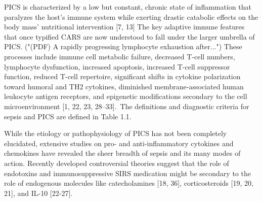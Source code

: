 PICS is characterized by a low but constant, chronic state of
inflammation that paralyzes the host's immune system while exerting
drastic catabolic effects on the body mass' nutritional intervention {[}7, 13{]}
The key adaptive immune features that once typified CARS are now
understood to fall under the larger umbrella of PICS. ("(PDF) A rapidly
progressing lymphocyte exhaustion after...") These processes include
immune cell metabolic failure, decreased T-cell numbers, lymphocyte
dysfunction, increased apoptosis, increased T-cell suppressor function,
reduced T-cell repertoire, significant shifts in cytokine polarization
toward humoral and TH2 cytokines, diminished membrane-associated human
leukocyte antigen receptors, and epigenetic modifications secondary to
the cell microenvironment {[}1, 22, 23, 28--33{]}.~The definitions and
diagnostic criteria for sepsis and PICS are defined in Table 1.1.

While the etiology or pathophysiology of PICS has not been completely
elucidated, extensive studies on pro- and anti-inflammatory cytokines
and chemokines have revealed the sheer breadth of sepsis and its many
modes of action. Recently developed controversial theories suggest that
the role of endotoxins and immunosuppressive SIRS medication might be
secondary to the role of endogenous molecules like catecholamines {[}18,
36{]}, corticosteroids {[}19, 20, 21{]}, and IL-10 {[}22-27{]}.
